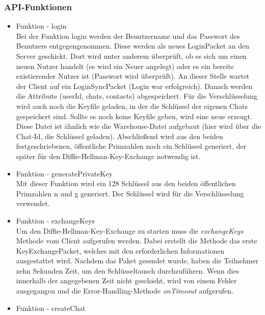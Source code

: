 \subsubsection*{API-Funktionen}
\begin{itemize}
    \item Funktion - login\\
    Bei der Funktion login werden der Benutzername und das Passwort des Benutzers entgegengenommen. Diese werden als neues LoginPacket an den Server geschickt. Dort wird unter anderem überprüft, ob es sich um einen neuen Nutzer handelt (es wird ein Neuer angelegt) oder es ein bereits existierender Nutzer ist (Passwort wird überprüft). An dieser Stelle wartet der Client auf ein LoginSyncPacket (Login war erfolgreich). Danach werden die Attribute (userId, chats, contacts) abgespeichert. Für die Verschlüsselung wird auch noch die Keyfile geladen, in der die Schlüssel der eigenen Chats gespeichert sind. Sollte es noch keine Keyfile geben, wird eine neue erzeugt. Diese Datei ist ähnlich wie die Warehouse-Datei aufgebaut (hier wird über die Chat-Id, die Schlüssel geladen). Abschließend wird aus den beiden festgeschriebenen, öffentliche Primzahlen noch ein Schlüssel generiert, der später für den Diffie-Hellman-Key-Exchange notwendig ist.
    
    \item Funktion - generatePrivateKey\\
    Mit dieser Funktion wird ein 128 Schlüssel aus den beiden öffentlichen Primzahlen n und g generiert. Der Schlüssel wird für die Verschlüsselung verwendet.
    
    \item Funktion - exchangeKeys\\
    Um den Diffie-Hellman-Key-Exchange zu starten muss die \textit{exchangeKeys} Methode vom Client aufgerufen werden.
    Dabei erstellt die Methode das erste KeyExchangePacket, welches mit den erforderlichen Informationen
    ausgestattet wird. Nachdem das Paket gesendet wurde, haben die Teilnehmer zehn Sekunden Zeit, um den Schlüsseltausch durchzuführen.
    Wenn dies innerhalb der angegebenen Zeit nicht geschieht, wird von einem Fehler ausgegangen und die Error-Handling-Methode \textit{onTimeout} aufgerufen.
    
    \item Funktion - createChat\\

\end{itemize}
